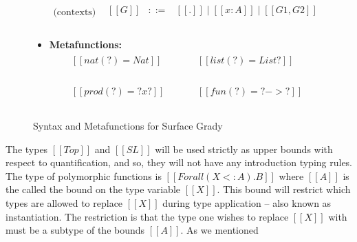 \begin{figure}
\begin{mdframed}
\begin{itemize}
\[\begin{array}{cl}
        \text{(contexts)}  &
        \begin{array}{lcl}
          [[G]] & ::= & [[.]] \mid [[x : A]] \mid [[G1,G2]]\\
        \end{array}\\
      \end{array}
      \]
    \item[] \textbf{Metafunctions:}
      \[
      \begin{array}{lll}
        \begin{array}{lll}
          [[nat(?) = Nat]]\\
          [[nat(Nat) = Nat]]\\
        \end{array}
        & \quad & 
        \begin{array}{lll}
          [[list(?) = List ?]]\\
          [[list(List A) = List A]]\\
        \end{array}\\\\                       
        \begin{array}{lll}
          [[prod(?) = ? x ?]]\\
          [[prod(A x B) = A x B]]\\
        \end{array}
        & \quad &
        \begin{array}{lll}
          [[fun(?) = ? -> ?]]\\
          [[fun(A -> B) = A -> B]]\\
        \end{array}
      \end{array}
      \]
    \end{itemize}
  \end{mdframed}
  \caption{Syntax and Metafunctions for Surface Grady}
  \label{fig:syntax-surface-grady}
\end{figure}
The types $[[Top]]$ and $[[SL]]$ will be used strictly as upper bounds
with respect to quantification, and so, they will not have any
introduction typing rules. The type of polymorphic functions is
$[[Forall (X <: A).B]]$ where $[[A]]$ is the called the bound on the
type variable $[[X]]$.  This bound will restrict which types are
allowed to replace $[[X]]$ during type application -- also known as
instantiation.  The restriction is that the type one wishes to replace
$[[X]]$ with must be a subtype of the bounds $[[A]]$.  As we mentioned

